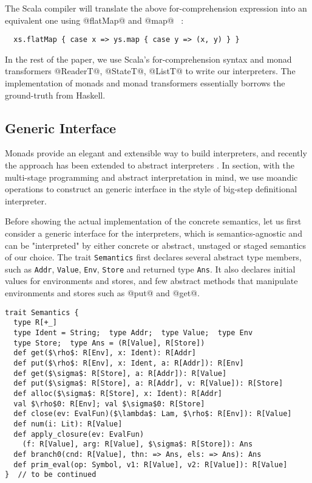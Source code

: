 The Scala compiler will translate the above for-comprehension expression into
an equivalent one using @flatMap@ and @map@ ~\cite{scala_spec}:

\begin{lstlisting}
  xs.flatMap { case x => ys.map { case y => (x, y) } }
\end{lstlisting}

In the rest of the paper, we use Scala's for-comprehension syntax and monad
transformers @ReaderT@, @StateT@, @ListT@ to write our interpreters. The
implementation of monads and monad transformers essentially borrows the
ground-truth from Haskell.

\subsection{Generic Interface} \label{generic_if}

Monads provide an elegant and extensible way to build
interpreters\cite{DBLP:conf/popl/LiangHJ95, Steele:1994:BIC:174675.178068,
Wadler:1992:EFP:143165.143169}, and recently the approach has been extended to
abstract interpreters \cite{Sergey:2013:MAI:2491956.2491979,
DBLP:journals/pacmpl/DaraisLNH17}. In section, with the multi-stage programming
and abstract interpretation in mind, we use moandic operations to construct an
generic interface in the style of big-step definitional interpreter.


Before showing the actual implementation of the concrete semantics, let us first
consider a generic interface for the interpreters, which is semantics-agnostic
and can be "interpreted" by either concrete or abstract, unstaged or staged
semantics of our choice. The trait \texttt{Semantics} first declares several
abstract type members, such as \texttt{Addr}, \texttt{Value}, \texttt{Env},
\texttt{Store} and returned type \texttt{Ans}. It also declares initial values
for environments and stores, and few abstract methods that manipulate
environments and stores such as @put@ and @get@.

\begin{lstlisting}
trait Semantics {
  type R[+_]
  type Ident = String;  type Addr;  type Value;  type Env
  type Store;  type Ans = (R[Value], R[Store])
  def get($\rho$: R[Env], x: Ident): R[Addr]
  def put($\rho$: R[Env], x: Ident, a: R[Addr]): R[Env]
  def get($\sigma$: R[Store], a: R[Addr]): R[Value]
  def put($\sigma$: R[Store], a: R[Addr], v: R[Value]): R[Store]
  def alloc($\sigma$: R[Store], x: Ident): R[Addr]
  val $\rho$0: R[Env]; val $\sigma$0: R[Store]
  def close(ev: EvalFun)($\lambda$: Lam, $\rho$: R[Env]): R[Value]
  def num(i: Lit): R[Value]
  def apply_closure(ev: EvalFun)
    (f: R[Value], arg: R[Value], $\sigma$: R[Store]): Ans
  def branch0(cnd: R[Value], thn: => Ans, els: => Ans): Ans
  def prim_eval(op: Symbol, v1: R[Value], v2: R[Value]): R[Value]
}  // to be continued
\end{lstlisting}

